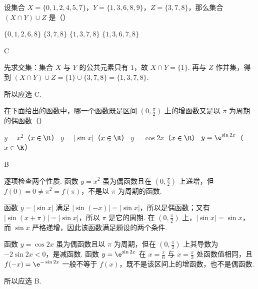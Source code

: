\documentclass[UTF8,a4paper,oneside,11pt]{ctexbook}
\begin{document}
\begin{problem}

设集合 \(X = \{0,1,2,4,5,7\}\)，\(Y = \{1,3,6,8,9\}\)，\(Z = \{3,7,8\}\)，那么集合 \((X \cap Y) \cup Z\) 是（\quad）

\choices
    {\(\{0,1,2,6,8\}\)}
    {\(\{3,7,8\}\)}
    {\(\{1,3,7,8\}\)}
    {\(\{1,3,6,7,8\}\)}

\begin{answer}
C
\end{answer}

\begin{solution}
先求交集：集合 \(X\) 与 \(Y\) 的公共元素只有 \(1\)，故
\(X\cap Y=\{1\}\). 再与 \(Z\) 作并集，得到
\((X\cap Y)\cup Z=\{1\}\cup\{3,7,8\}=\{1,3,7,8\}\).

所以应选 C.
\end{solution}
\end{problem}

\begin{problem}

在下面给出的函数中，哪一个函数既是区间 \(\left(0,\frac{\pi}{2}\right)\) 上的增函数又是以 \(\pi\) 为周期的偶函数（\quad）

\choices
    {\(y=x^{2}\)（\(x\in\R\)）}
    {\(y=|\sin x|\)（\(x\in\R\)）}
    {\(y=\cos 2x\)（\(x\in\R\)）}
    {\(y=\e^{\sin 2x}\)（\(x\in\R\)）}

\begin{answer}
B
\end{answer}

\begin{solution}
逐项检查两个性质. 函数 \(y=x^2\) 虽为偶函数且在 \(\left(0,\frac{\pi}{2}\right)\) 上递增，但 \(f(0)=0\ne\pi^2=f(\pi)\)，不是以 \(\pi\) 为周期的函数.

函数 \(y=|\sin x|\) 满足 \(|\sin(-x)|=|\sin x|\)，所以是偶函数；又有 \(|\sin(x+\pi)|=|\sin x|\)，所以 \(\pi\) 是它的周期. 在 \(\left(0,\frac{\pi}{2}\right)\) 上，\(|\sin x|=\sin x\)，而 \(\sin x\) 严格递增，因此该函数满足题设的两个条件.

函数 \(y=\cos 2x\) 虽为偶函数且以 \(\pi\) 为周期，但在 \(\left(0,\frac{\pi}{2}\right)\) 上其导数为 \(-2\sin 2x<0\)，是减函数. 函数 \(y=\e^{\sin 2x}\) 在 \(x=\frac{\pi}{6}\) 与 \(x=\frac{\pi}{3}\) 处函数值相同，且 \(f(-x)=\e^{-\sin 2x}\) 一般不等于 \(f(x)\)，既不是该区间上的增函数，也不是偶函数.

所以应选 B.
\end{solution}
\end{problem}
\end{document}
